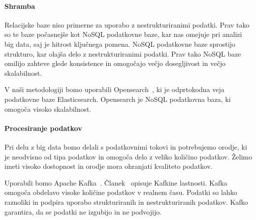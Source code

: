 

\paragraph{Shramba}
Relacijske baze niso primerne za uporabo z nestrukturiranimi podatki.
Prav tako so te baze počasnejše kot NoSQL podatkovne baze,
kar nas omejuje pri analizi big data, saj je hitrost ključnega pomena.
NoSQL podatkovne baze sprostijo strukturo, kar olajša delo z nestrukturiranimi podatki.
Prav tako NoSQL baze omilijo zahteve glede konsistence in
omogočajo večjo dosegljivost in večjo skalabilnost.

V naši metodologiji bomo uporabili Opensearch~\cite{tech_opensearch}, 
ki je odprtokodna veja podatkovne baze Elasticsearch.
Opensearch je NoSQL podatkovna baza, ki omogoča visoko skalabilnost.

\paragraph{Procesiranje podatkov}
Pri delu z big data bomo delali s podatkovnimi tokovi
in potrebujemo orodje, ki je neodvisno od tipa podatkov in omogoča delo z veliko količino podatkov.
Želimo imeti visoko dostopnost in orodje mora ohranjati kvaliteto podatkov.

Uporabili bomo Apache Kafka~\cite{tech_kafka}.
Članek~\cite{iterative_methodology} opisuje Kafkine lastnosti.
Kafka omogoča obdelavo visoke količine podatkov v realnem času.
Podatki so lahko raznoliki in podpira uporabo strukturiranih in nestrukturiranih podatkov.
Kafko garantira, da se podatki ne izgubijo in ne podvojijo.